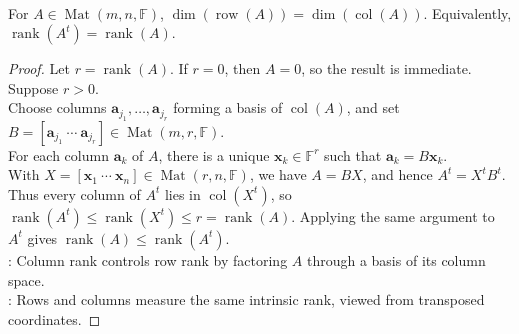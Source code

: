 \begin{theorem} \label{thm:row-rank-equals-column-rank} \\
For $A\in\operatorname{Mat}(m,n,\mathbb{F})$, $\dim(\operatorname{row}(A))=\dim(\operatorname{col}(A))$. Equivalently, $\operatorname{rank}(A^t)=\operatorname{rank}(A)$.
\begin{proof}
Let $r=\operatorname{rank}(A)$. If $r=0$, then $A=0$, so the result is immediate. Suppose $r>0$.\\
Choose columns $\mathbf{a}_{j_1},\ldots,\mathbf{a}_{j_r}$ forming a basis of $\operatorname{col}(A)$, and set $B=[\mathbf{a}_{j_1}\ \cdots\ \mathbf{a}_{j_r}]\in\operatorname{Mat}(m,r,\mathbb{F})$.\\
For each column $\mathbf{a}_k$ of $A$, there is a unique $\mathbf{x}_k\in\mathbb{F}^r$ such that $\mathbf{a}_k=B\mathbf{x}_k$.\\
With $X=[\mathbf{x}_1\ \cdots\ \mathbf{x}_n]\in\operatorname{Mat}(r,n,\mathbb{F})$, we have $A=BX$, and hence $A^t=X^tB^t$. Thus every column of $A^t$ lies in $\operatorname{col}(X^t)$, so $\operatorname{rank}(A^t)\leq \operatorname{rank}(X^t)\leq r=\operatorname{rank}(A)$.
Applying the same argument to $A^t$ gives $\operatorname{rank}(A)\leq\operatorname{rank}(A^t)$.\\
: Column rank controls row rank by factoring $A$ through a basis of its column space.\\
: Rows and columns measure the same intrinsic rank, viewed from transposed coordinates.
\end{proof}
\end{theorem}

